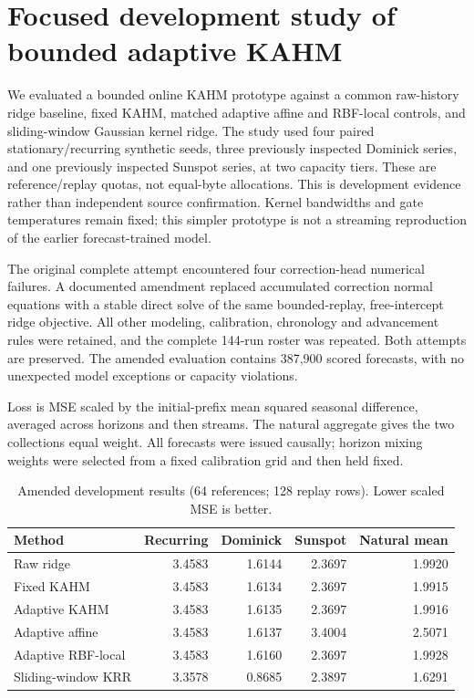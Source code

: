 

\section{Focused development study of bounded adaptive KAHM}

\label{sec:adaptive-development}

We evaluated a bounded online KAHM prototype against a common raw-history ridge baseline, fixed KAHM, matched adaptive affine and RBF-local controls, and sliding-window Gaussian kernel ridge. The study used four paired stationary/recurring synthetic seeds, three previously inspected Dominick series, and one previously inspected Sunspot series, at two capacity tiers. These are reference/replay quotas, not equal-byte allocations. This is development evidence rather than independent source confirmation. Kernel bandwidths and gate temperatures remain fixed; this simpler prototype is not a streaming reproduction of the earlier forecast-trained model.

The original complete attempt encountered four correction-head numerical failures. A documented amendment replaced accumulated correction normal equations with a stable direct solve of the same bounded-replay, free-intercept ridge objective. All other modeling, calibration, chronology and advancement rules were retained, and the complete 144-run roster was repeated. Both attempts are preserved. The amended evaluation contains 387,900 scored forecasts, with no unexpected model exceptions or capacity violations.

Loss is MSE scaled by the initial-prefix mean squared seasonal difference, averaged across horizons and then streams. The natural aggregate gives the two collections equal weight. All forecasts were issued causally; horizon mixing weights were selected from a fixed calibration grid and then held fixed.

\begin{table}[t]
\centering
\small
\caption{Amended development results (64 references; 128 replay rows). Lower scaled MSE is better.}
\label{tab:adaptive-small}
\begin{tabular}{lrrrr}
\hline
Method & Recurring & Dominick & Sunspot & Natural mean \\
\hline
Raw ridge & 3.4583 & 1.6144 & 2.3697 & 1.9920 \\
Fixed KAHM & 3.4583 & 1.6134 & 2.3697 & 1.9915 \\
Adaptive KAHM & 3.4583 & 1.6135 & 2.3697 & 1.9916 \\
Adaptive affine & 3.4583 & 1.6137 & 3.4004 & 2.5071 \\
Adaptive RBF-local & 3.4583 & 1.6160 & 2.3697 & 1.9928 \\
Sliding-window KRR & 3.3578 & 0.8685 & 2.3897 & 1.6291 \\
\hline
\end{tabular}
\end{table}

